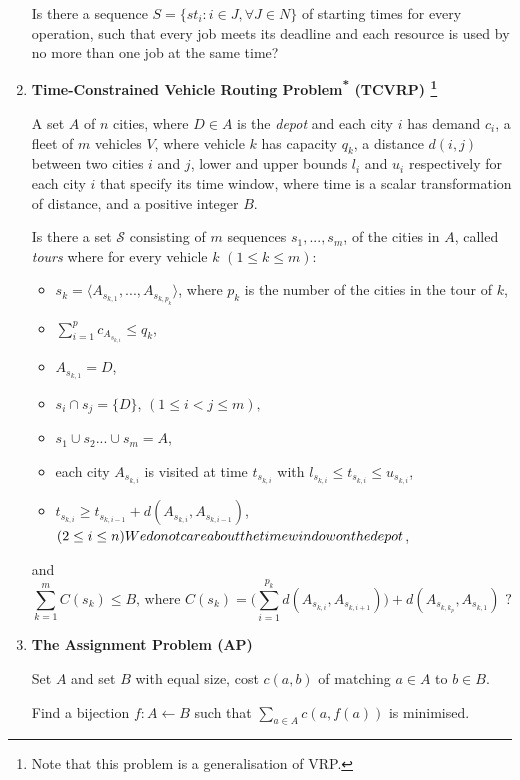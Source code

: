 \documentclass{mprop}
\theoremstyle{definition}
\begin{document}
\begin{enumerate}
\begin{question}
Is there a sequence $S = \{st_{i} : i \in J, \forall J \in N\}$ of starting times for every operation, such that every job meets its deadline and each resource is used by no more than one job at the same time?
\end{question}

\item \textbf{Time-Constrained Vehicle Routing Problem\textsuperscript{*}
(TCVRP) \footnote{Note that this problem is a generalisation of VRP.}}
\begin{instance}
A set $A$ of $n$ cities, where $D \in A$ is the \textit{depot} and each city $i$ has demand $c_{i}$, a fleet of $m$ vehicles $V$, where vehicle $k$ has capacity $q_{k}$, a distance $d(i,j)$ between two cities $i$ and $j$, lower and upper bounds $l_{i}$ and $u_{i}$ respectively for each city $i$ that specify its time window, where time is a scalar transformation of distance, and a positive integer $B$.
\end{instance}

\begin{question}
Is there a set $\mathcal{S}$ consisting of $m$ sequences $s_{1},...,s_{m}$, of the cities in $A$, called \textit{tours}
where for every vehicle $k$ $(1 \leq k \leq m)$:
\begin{itemize}
\item $s_{k} = \langle A_{s_{k,1}},...,A_{s_{k,p_{k}}} \rangle$, \quad where $p_{k}$ is the number of the cities in the tour of $k$,
\item $\sum_{i = 1}^{p} c_{A_{s_{k,i}}} \leq q_{k}$,
\item $A_{s_{k,1}} = D$,
\item $s_{i} \cap s_{j} = \{D\}$, \quad $(1 \leq i < j \leq m),$
\item $s_{1} \cup s_{2} ... \cup s_{m} = A$,
\item each city $A_{s_{k,i}}$ is visited at time $t_{s_{k,i}}$ with $l_{s_{k,i}} \leq t_{s_{k,i}} \leq u_{s_{k,i}}$,
\item $t_{s_{k,i}} \geq t_{s_{k,i-1}} + d(A_{s_{k,i}},A_{s_{k,i-1}})$, \quad $(2 \leq i \leq n) \footnote{We do not care about the time window on the depot}$,
\end{itemize}
and
$$ \sum_{k=1}^{m} C(s_{k}) \leq B \textrm{, where } C(s_{k}) = \bigg( \sum_{i=1}^{p_{k}} d(A_{s_{k,i}}, A_{s_{k,i+1}}) \bigg) + d(A_{s_{k,k_{p}}}, A_{s_{k,1}}) \textrm{ ?}$$
\end{question}

\item \textbf{The Assignment Problem (AP)}
\begin{instance}
Set $A$ and set $B$ with equal size, cost $c(a,b)$ of matching $a \in A$ to $b \in B$.
\end{instance}

\begin{question}
Find a bijection $f: A \gets B$ such that $\sum_{a\in A} c(a,f(a))$ is minimised.
\end{question}

\end{enumerate}
\end{document}
